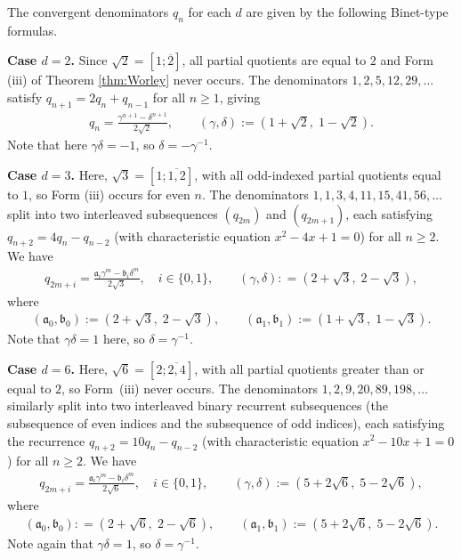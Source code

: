 \documentclass[11pt,a4paper]{article}
\numberwithin{equation}{section}
\numberwithin{table}{section}
\numberwithin{figure}{section}
\begin{document}
\medskip

The convergent denominators $q_n$ for each $d$ are given by the following Binet-type formulas.

\medskip

\textbf{Case $d=2$.} Since $\sqrt{2} = [1;\overline{2}]$, all partial quotients are equal to $2$ and Form {\rm(iii)} of Theorem \ref{thm:Worley} never occurs. The denominators $1,2,5,12,29,\ldots$ satisfy $q_{n+1}=2q_n+q_{n-1}$ for all $n\ge 1$, giving 
\begin{align*}
	q_n = \frac{\gamma^{n+1}-\delta^{n+1}}{2\sqrt{2}},
	\qquad (\gamma,\delta) := (1+\sqrt{2},\;1-\sqrt{2}).
\end{align*}
Note that here $\gamma\delta=-1$, so $\delta=-\gamma^{-1}$.  

\textbf{Case $d=3$.}
Here, $\sqrt{3} = [1;\overline{1,2}]$, with all odd-indexed partial quotients equal to $1$, so Form {\rm(iii)} occurs for even $n$. The denominators $1,1,3,4,11,15,41,56,\ldots$ split into two interleaved subsequences $(q_{2m})$ and $(q_{2m+1})$, each satisfying $q_{n+2} = 4q_n - q_{n-2}$ (with characteristic equation $x^2-4x+1=0$) for all $n\ge 2$. We have
\begin{align*}
	q_{2m+i} = \frac{\mathfrak{a}_i\gamma^m - \mathfrak{b}_i\delta^m}{2\sqrt{3}},
	\quad i \in \{0,1\},\qquad
	(\gamma,\delta): = (2+\sqrt{3},\;2-\sqrt{3}),
\end{align*}
where
\begin{align*}
	(\mathfrak{a}_0,\mathfrak{b}_0) := (2+\sqrt{3},\;2-\sqrt{3}),
	\qquad
	(\mathfrak{a}_1,\mathfrak{b}_1) := (1+\sqrt{3},\;1-\sqrt{3}).
\end{align*}
Note that $\gamma\delta = 1$ here, so $\delta = \gamma^{-1}$.

\medskip

\textbf{Case $d=6$.} Here, $\sqrt{6} = [2;\overline{2,4}]$, with all partial quotients greater than or equal to $2$, so
Form~{\rm(iii)} never occurs. The denominators $1,2,9,20,89,198,\ldots$ similarly split into two interleaved binary recurrent subsequences (the subsequence of even indices and the subsequence of odd indices), each satisfying the recurrence $q_{n+2} = 10q_n - q_{n-2}$ (with characteristic equation $x^2-10x+1=0$) for all $n\ge 2$. We have
\begin{align*}
	q_{2m+i} = \frac{\mathfrak{a}_i\gamma^m - \mathfrak{b}_i\delta^m}{2\sqrt{6}},
	\quad i \in \{0,1\},\qquad
	(\gamma,\delta) := (5+2\sqrt{6},\;5-2\sqrt{6}),
\end{align*}
where
\begin{align*}
	(\mathfrak{a}_0,\mathfrak{b}_0): = (2+\sqrt{6},\;2-\sqrt{6}),
	\qquad
	(\mathfrak{a}_1,\mathfrak{b}_1) := (5+2\sqrt{6},\;5-2\sqrt{6}).
\end{align*}
Note again that $\gamma\delta = 1$, so $\delta=\gamma^{-1}$.
\end{document}
